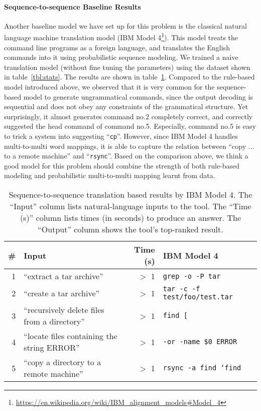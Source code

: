 \paragraph{Sequence-to-sequence Baseline Results} Another baseline model we have 
set up for this problem is the classical natural language machine translation 
model (IBM Model 4\footnote{\url{https://en.wikipedia.org/wiki/IBM_alignment_models\#Model_4}}). 
This model treats the command line programs as a foreign language, and translates 
the English commands into it using probabilistic sequence modeling. We trained a 
naive translation model (without fine tuning the parameters) using the dataset shown
in table~\ref{tbl:stats}. The results are shown in table~\ref{tbl:manual-inspection-ibm4}.
Compared to the rule-based model introduced above, we observed that it is very common for 
the sequence-based model to generate ungrammatical commands, since the output decoding 
is sequential and does not obey any constraints of the grammatical structure. Yet surprisingly, 
it almost generates command no.2 completely correct, and correctly suggested the head 
command of command no.5. Especially, command no.5 is easy to trick a system into suggesting 
``\texttt{cp}''. However, since IBM Model 4 handles multi-to-multi word mappings, it is 
able to capture the relation between ``copy ... to a remote machine'' and ``\texttt{rsync}''.
Based on the comparison above, we think a good model for this problem should combine the
strength of both rule-based modeling and probabilistic multi-to-multi mapping learnt
from data.

\begin{table}
    \begin{center}
    \begin{tabular}{rlrl}
        \# & \textbf{Input} & \textbf{Time (s)} &{IBM Model 4} \\
        \hline
        1  & ``extract a tar archive'' & $>$ 1 & \texttt{grep -o -P tar} \\
        2  & ``create a tar archive''  & $>$ 1 & \texttt{tar -c -f test/foo/test.tar} \\
        3  & ``recursively delete files from a directory'' & $>$ 1 & \texttt{find [} \\
        4  & ``locate files containing the string ERROR''  & $>$ 1 & \texttt{-or -name \$0 ERROR} \\
        5  & ``copy a directory to a remote machine'' & $>$ 1 & \texttt{rsync -a find `find} \\
    \end{tabular}
    \end{center}
    \caption{Sequence-to-sequence translation based results by IBM Model 4. The ``Input'' column lists
        natural-language inputs to the tool. The ``Time (s)'' column lists times
        (in seconds) to produce an answer. The ``Output'' column shows the
        tool's top-ranked result.}
    \label{tbl:manual-inspection-ibm4}
\end{table}

